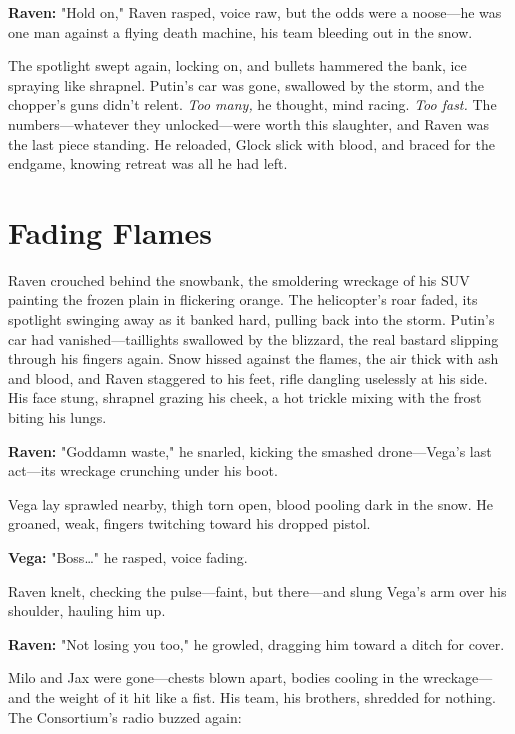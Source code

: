 \documentclass[12pt]{book}
\begin{document}
\vspace{0.5em}
\textbf{Raven:} "Hold on," Raven rasped, voice raw, but the odds were a noose—he was one man against a flying death machine, his team bleeding out in the snow.

The spotlight swept again, locking on, and bullets hammered the bank, ice spraying like shrapnel. Putin’s car was gone, swallowed by the storm, and the chopper’s guns didn’t relent. \textit{Too many,} he thought, mind racing. \textit{Too fast.} The numbers—whatever they unlocked—were worth this slaughter, and Raven was the last piece standing. He reloaded, Glock slick with blood, and braced for the endgame, knowing retreat was all he had left.

\vspace{1em}

\section{Fading Flames}

Raven crouched behind the snowbank, the smoldering wreckage of his SUV painting the frozen plain in flickering orange. The helicopter’s roar faded, its spotlight swinging away as it banked hard, pulling back into the storm. Putin’s car had vanished—taillights swallowed by the blizzard, the real bastard slipping through his fingers again. Snow hissed against the flames, the air thick with ash and blood, and Raven staggered to his feet, rifle dangling uselessly at his side. His face stung, shrapnel grazing his cheek, a hot trickle mixing with the frost biting his lungs.

\vspace{0.5em}
\textbf{Raven:} "Goddamn waste," he snarled, kicking the smashed drone—Vega’s last act—its wreckage crunching under his boot.

Vega lay sprawled nearby, thigh torn open, blood pooling dark in the snow. He groaned, weak, fingers twitching toward his dropped pistol.

\vspace{0.5em}
\textbf{Vega:} "Boss…" he rasped, voice fading.

Raven knelt, checking the pulse—faint, but there—and slung Vega’s arm over his shoulder, hauling him up.

\vspace{0.5em}
\textbf{Raven:} "Not losing you too," he growled, dragging him toward a ditch for cover.

Milo and Jax were gone—chests blown apart, bodies cooling in the wreckage—and the weight of it hit like a fist. His team, his brothers, shredded for nothing. The Consortium’s radio buzzed again:
\end{document}
